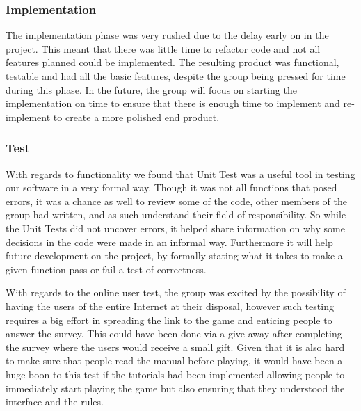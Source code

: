 \subsubsection{Implementation}
The implementation phase was very rushed due to the delay early on in the project. This meant that there was little time to refactor code and not all features planned could be implemented. The resulting product was functional, testable and had all the basic features, despite the group being pressed for time during this phase. In the future, the group will focus on starting the implementation on time to ensure that there is enough time to implement and re-implement to create a more polished end product.

\subsubsection{Test}
With regards to functionality we found that Unit Test was a useful tool in testing our software in a very formal way. Though it was not all functions that posed errors, it was a chance as well to review some of the code, other members of the group had written, and as such understand their field of responsibility. So while the Unit Tests did not uncover errors, it helped share information on why some decisions in the code were made in an informal way. Furthermore it will help future development on the project, by formally stating what it takes to make a given function pass or fail a test of correctness.\newline

With regards to the online user test, the group was excited by the possibility of having the users of the entire Internet at their disposal, however such testing requires a big effort in spreading the link to the game and enticing people to answer the survey. This could have been done via a give-away after completing the survey where the users would receive a small gift. Given that it is also hard to make sure that people read the manual before playing, it would have been a huge boon to this test if the tutorials had been implemented allowing people to immediately start playing the game but also ensuring that they understood the interface and the rules. 

